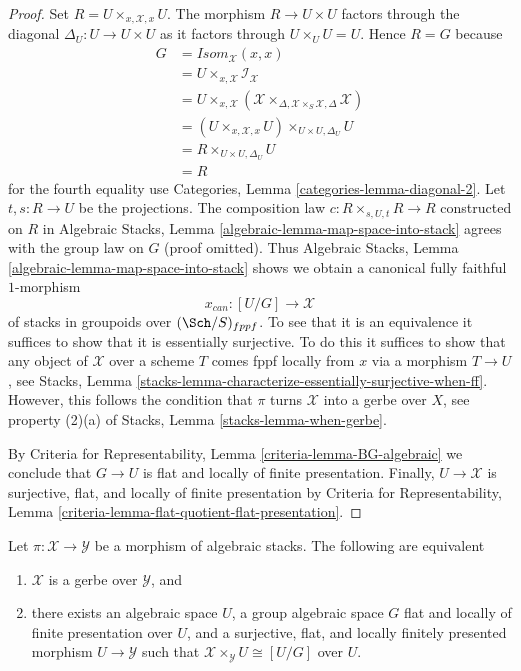 \begin{proof}
Set $R = U \times_{x, \mathcal{X}, x} U$. The morphism $R \to U \times U$
factors through the diagonal $\Delta_U : U \to U \times U$ as it factors
through $U \times_U U = U$. Hence $R = G$ because
\begin{align*}
G & = \mathit{Isom}_\mathcal{X}(x, x) \\
& = U \times_{x, \mathcal{X}} \mathcal{I}_\mathcal{X} \\
& = U \times_{x, \mathcal{X}}
(\mathcal{X}
\times_{\Delta, \mathcal{X} \times_S \mathcal{X}, \Delta}
\mathcal{X}) \\
& = (U \times_{x, \mathcal{X}, x} U) \times_{U \times U, \Delta_U} U \\
& = R \times_{U \times U, \Delta_U} U \\
& = R
\end{align*}
for the fourth equality use
Categories, Lemma \ref{categories-lemma-diagonal-2}.
Let $t, s : R \to U$ be the projections.
The composition law $c : R \times_{s, U, t} R \to R$ constructed on $R$ in
Algebraic Stacks, Lemma \ref{algebraic-lemma-map-space-into-stack}
agrees with the group law on $G$ (proof omitted). Thus
Algebraic Stacks, Lemma \ref{algebraic-lemma-map-space-into-stack}
shows we obtain a canonical fully faithful $1$-morphism
$$
x_{can} : [U/G] \longrightarrow \mathcal{X}
$$
of stacks in groupoids over $(\Sch/S)_{fppf}$. To see that it is
an equivalence it suffices to show that it is essentially surjective.
To do this it suffices to show that any object of $\mathcal{X}$ over
a scheme $T$ comes fppf locally from $x$ via a morphism $T \to U$, see
Stacks, Lemma \ref{stacks-lemma-characterize-essentially-surjective-when-ff}.
However, this follows the condition that $\pi$ turns $\mathcal{X}$
into a gerbe over $X$, see property (2)(a) of
Stacks, Lemma \ref{stacks-lemma-when-gerbe}.

\medskip\noindent
By
Criteria for Representability, Lemma \ref{criteria-lemma-BG-algebraic}
we conclude that $G \to U$ is flat and locally of finite presentation.
Finally, $U \to \mathcal{X}$ is surjective, flat, and locally of finite
presentation by
Criteria for Representability, Lemma
\ref{criteria-lemma-flat-quotient-flat-presentation}.
\end{proof}

\begin{lemma}
\label{lemma-local-structure-gerbe}
Let $\pi : \mathcal{X} \to \mathcal{Y}$ be a morphism of algebraic stacks.
The following are equivalent
\begin{enumerate}
\item $\mathcal{X}$ is a gerbe over $\mathcal{Y}$, and
\item there exists an algebraic space $U$, a group algebraic space $G$
flat and locally of finite presentation over $U$, and a
surjective, flat, and locally finitely presented
morphism $U \to \mathcal{Y}$ such that
$\mathcal{X} \times_\mathcal{Y} U \cong [U/G]$ over $U$.
\end{enumerate}
\end{lemma}

